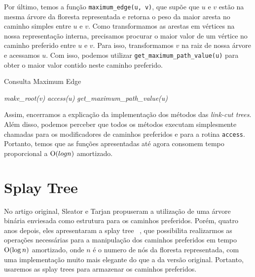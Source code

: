 Por último, temos a função \texttt{maximum\_edge(u, v)}, que supõe que $u$ e $v$ estão na mesma árvore da floresta representada e retorna o peso da maior aresta no caminho simples entre $u$ e $v$. Como transformamos as arestas em vértices na nossa representação interna, precisamos procurar o maior valor de um vértice no caminho preferido entre $u$ e $v$. Para isso, transformamos $v$ na raiz de nossa árvore e acessamos $u$. Com isso, podemos utilizar \texttt{get\_maximum\_path\_value(u)} para obter o maior valor contido neste caminho preferido.

\begin{algorithm}[h!]
    \caption{Consulta Maximum Edge}\label{lct:max-edge}
    \begin{algorithmic}
        \State \emph{make\_root(v)}
        \State \emph{access(u)}
        \State \Return \emph{get\_maximum\_path\_value(u)}
        \EndFunction
    \end{algorithmic}
\end{algorithm}

Assim, encerramos a explicação da implementação dos métodos das \emph{link-cut trees}. Além disso, podemos perceber que todos os métodos executam simplesmente chamadas para os modificadores de caminhos preferidos e para a rotina \texttt{access}. Portanto, temos que as funções apresentadas até agora consomem tempo proporcional a $\mathrm{O}(log n)$ amortizado.

\section{Splay Tree}
\label{sec:lct-splay-trees}

No artigo original, Sleator e Tarjan propuseram a utilização de uma árvore binária enviesada como estrutura para os caminhos preferidos. Porém, quatro anos depois, eles apresentaram a splay tree ~\citep{10.1145/3828.3835}, que possibilita realizarmos as operações necessárias para a manipulação dos caminhos preferidos em tempo $\mathrm{O}(\log n)$ amortizado, onde $n$ é o numero de nós da floresta representada, com uma implementação muito mais elegante do que a da versão original. Portanto, usaremos as splay trees para armazenar os caminhos preferidos.

